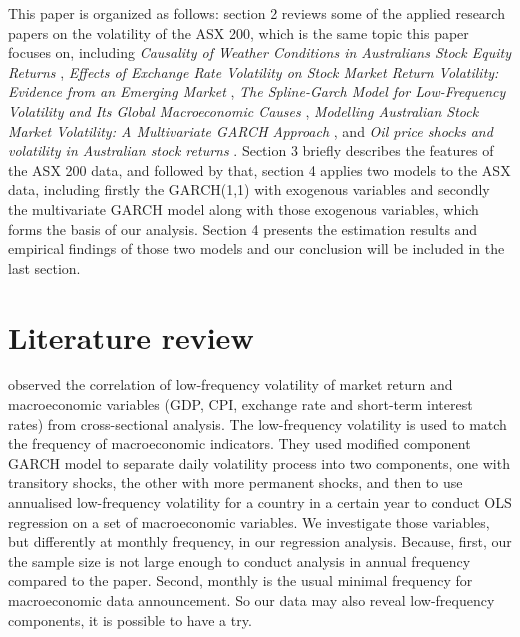 \documentclass[11pt]{article}
\begin{document}
This paper is organized as follows: section 2 reviews some of the applied research papers on the volatility of the ASX 200, which is the same topic this paper focuses on, including \emph{Causality of Weather Conditions in Australians Stock Equity Returns} \citep{Weather}, \emph{Effects of Exchange Rate Volatility on Stock Market Return Volatility: Evidence from an Emerging Market} \citep{exr}, \emph{The Spline-Garch Model for Low-Frequency Volatility and Its Global Macroeconomic Causes} \citep{Spline}, \emph{Modelling Australian Stock Market Volatility: A Multivariate GARCH Approach} \citep{index}, and \emph{Oil price shocks and volatility in Australian stock returns} \citep{oil}.
Section 3 briefly describes the features of the ASX 200 data, and followed by that, section 4 applies two models to the ASX data, including firstly the GARCH(1,1) with exogenous variables and secondly the multivariate GARCH model along with those exogenous variables, which forms the basis of our analysis. Section 4 presents the estimation results and empirical findings of those two models and our conclusion will be included in the last section. 

\section{Literature review}	
\cite{Spline} observed the correlation of low-frequency volatility of market return and macroeconomic variables (GDP, CPI, exchange rate and short-term interest rates) from cross-sectional analysis. The low-frequency volatility is used to match the frequency of macroeconomic indicators. They used modified component GARCH model to separate daily volatility process into two components, one with transitory shocks, the other with more permanent shocks, and then to use annualised low-frequency volatility for a country in a certain year to conduct OLS regression on a set of macroeconomic variables. We investigate those variables, but differently at monthly frequency, in our regression analysis. Because, first, our the sample size is not large enough to conduct analysis in annual frequency compared to the paper. Second, monthly is the usual minimal frequency for macroeconomic data announcement. So our data may also reveal low-frequency components, it is possible to have a try. 
\end{document}
